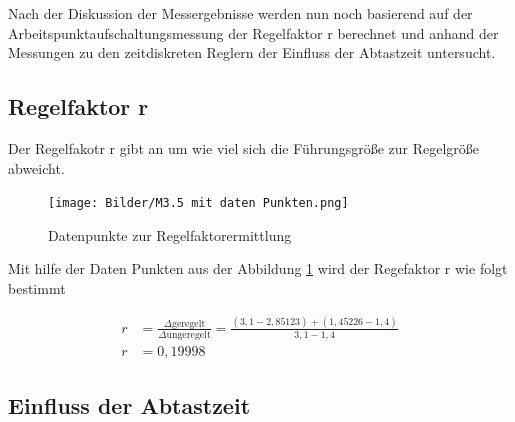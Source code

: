 \documentclass{report}
\begin{document}
\textmd{Nach der Diskussion der Messergebnisse werden nun noch basierend auf der Arbeitspunktaufschaltungsmessung der Regelfaktor r berechnet und anhand der Messungen zu den zeitdiskreten Reglern der Einfluss der Abtastzeit untersucht.}%

\subsection{Regelfaktor r}
\textmd{Der Regelfakotr r gibt an um wie viel sich die Führungsgröße zur Regelgröße abweicht.}
        \begin{figure}[H]
            \centering
            \texttt{[image: Bilder/M3.5 mit daten Punkten.png]}
            \caption{Datenpunkte zur Regelfaktorermittlung}
            \label{fig:M3.5 mit daten Punkten png}
        \end{figure}
		\textmd{Mit hilfe der Daten Punkten aus der Abbildung \ref{fig:M3.5 mit daten Punkten png} wird der Regefaktor r wie folgt bestimmt}

\begin{align*}
    r &= \frac{\Delta \mathrm{geregelt}}{\Delta \mathrm{ungeregelt}}=\frac{(3,1-2,85123)+(1,45226-1,4)}{3,1-1,4}\\
    r &= 0,19998
\end{align*}


\subsection{Einfluss der Abtastzeit}
\end{document}

